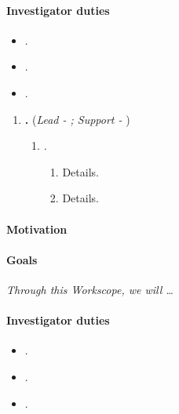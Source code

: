 \documentclass[11pt,letterpaper]{article}
\begin{document}
\paragraph*{Investigator duties}
\begin{itemize}[topsep=0pt,itemsep=-0.5ex,partopsep=1ex,parsep=1ex,leftmargin=*]
    \item[].
    \item[].
    \item[].
\end{itemize}

    
\begin{enumerate}[resume,topsep=0pt,itemsep=-0.5ex,partopsep=1ex,parsep=1ex,label=\textbf{Workscope \arabic* -},align=left,leftmargin=*]
    \item\textbf{.} (\textit{Lead - ; Support - })
        \begin{enumerate}[resume=innerlist,topsep=3pt,itemsep=1.5ex,partopsep=1ex,parsep=-1ex,label=\textit{Task \Roman*.},align=left,leftmargin=-0.50in]
            \item\textit{.}
                \begin{enumerate}[topsep=0pt,itemsep=-0.5ex,partopsep=1ex,parsep=1ex,label=(\arabic*),leftmargin=0.15in]
                    \item Details.
                    \item Details.
                \end{enumerate}
        \end{enumerate}
\end{enumerate}


\paragraph*{Motivation}

\paragraph*{Goals}
\textit{Through this Workscope, we will \ldots}

\paragraph*{Investigator duties}
\begin{itemize}[topsep=0pt,itemsep=-0.5ex,partopsep=1ex,parsep=1ex,leftmargin=*]
    \item[].
    \item[].
    \item[].
\end{itemize}
\end{document}

